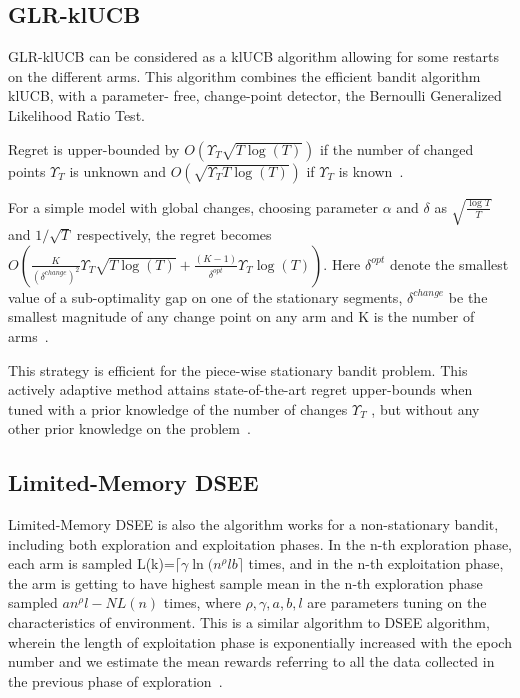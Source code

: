 \subsection{GLR-klUCB}\label{subsec:glr-klucb}
GLR-klUCB can be considered as a klUCB algorithm allowing for some restarts on the different arms.
This algorithm combines the efficient bandit algorithm klUCB, with a parameter- free, change-point detector, the Bernoulli Generalized Likelihood Ratio Test.
\par
Regret is upper-bounded by $ O\left(\Upsilon_T \sqrt{T \log\left(T\right)} \right)$ if the number of changed points $\Upsilon_T $ is unknown and $ O\left(\sqrt{\Upsilon_T T \log\left(T\right)} \right)$ if  $\Upsilon_T $ is known~\citep{besson2019}.
\par
For a simple model with global changes, choosing parameter $\alpha$ and $\delta $ as $\sqrt{\frac{\log T}{T}}$ and $1/\sqrt{T}$ respectively, the regret becomes $O\left(\frac{K}{\left(\delta^{change}\right)^2} \Upsilon_T \sqrt{T \log\left(T\right)}+\frac{\left(K-1\right)}{\delta^{opt}} \Upsilon_T \log\left(T\right)\right)$.
Here $\delta^{opt}$ denote the smallest value of a sub-optimality gap on one of the stationary segments, $\delta^{change}$ be the smallest magnitude of any change point on any arm and K is the number of arms~\citep{besson2019}.
\par
This strategy is efficient for the piece-wise stationary bandit problem.
This actively adaptive method attains state-of-the-art regret upper-bounds when tuned with a prior knowledge of the number of changes $ \Upsilon_T $ , but without any other prior knowledge on the problem~\citep{besson2019}.

\subsection{Limited-Memory DSEE}\label{subsec:limited-memory-dsee} %
Limited-Memory DSEE is also the algorithm works for a non-stationary bandit, including both exploration and exploitation phases.
In the n-th exploration phase, each arm is sampled L(k)=$\lceil\gamma\ln({n^{\rho}lb}\rceil$ times, and in the n-th exploitation phase, the arm is getting to have highest sample mean in the n-th exploration phase sampled $an^{\rho}l-NL(n)$ times, where $\rho, \gamma,a,b,l$ are parameters tuning on the characteristics of environment.
\newline This is a similar algorithm to DSEE algorithm, wherein the length of exploitation phase is exponentially increased with the epoch number and we estimate the mean rewards referring to all the data collected in the previous phase of exploration~\citep{wei2018abruptly}.

